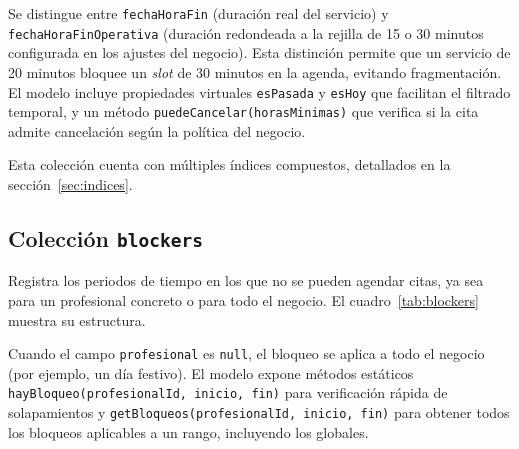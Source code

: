 Se distingue entre \texttt{fechaHoraFin} (duraci\'on real del servicio) y \texttt{fechaHoraFinOperativa} (duraci\'on redondeada a la rejilla de 15 o 30 minutos configurada en los ajustes del negocio). Esta distinci\'on permite que un servicio de 20 minutos bloquee un \textit{slot} de 30 minutos en la agenda, evitando fragmentaci\'on. El modelo incluye propiedades virtuales \texttt{esPasada} y \texttt{esHoy} que facilitan el filtrado temporal, y un m\'etodo \texttt{puedeCancelar(horasMinimas)} que verifica si la cita admite cancelaci\'on seg\'un la pol\'itica del negocio.

Esta colecci\'on cuenta con m\'ultiples \'indices compuestos, detallados en la secci\'on~\ref{sec:indices}.

\subsection{Colecci\'on \texttt{blockers}}\label{subsec:blockers}

Registra los periodos de tiempo en los que no se pueden agendar citas, ya sea para un profesional concreto o para todo el negocio. El cuadro~\ref{tab:blockers} muestra su estructura.


Cuando el campo \texttt{profesional} es \texttt{null}, el bloqueo se aplica a todo el negocio (por ejemplo, un d\'ia festivo). El modelo expone m\'etodos est\'aticos \texttt{hayBloqueo(profesionalId, inicio, fin)} para verificaci\'on r\'apida de solapamientos y \texttt{getBloqueos(profesionalId, inicio, fin)} para obtener todos los bloqueos aplicables a un rango, incluyendo los globales.

